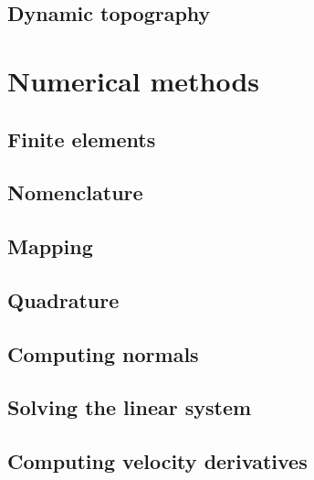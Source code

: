 \documentclass[a4paper,12pt]{article}
\begin{document}
\subsection{Dynamic topography}



\newpage
\section{Numerical methods}

\subsection{Finite elements}


\subsection{Nomenclature}


\subsection{Mapping}


\subsection{Quadrature}


\subsection{Computing normals}


\subsection{Solving the linear system}


\subsection{Computing velocity derivatives}

\end{document}
